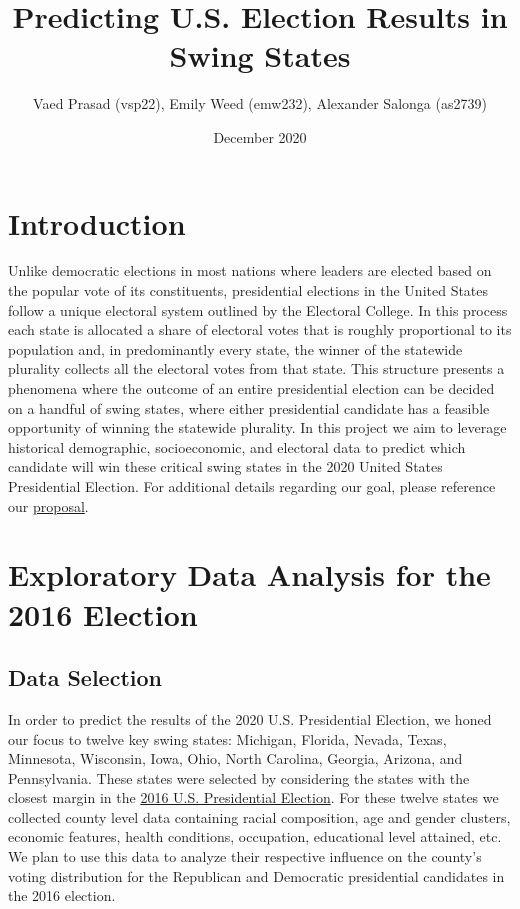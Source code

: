\documentclass[letterpaper, twocolumn]{article}
\title{Predicting U.S. Election Results in Swing States}
\author{Vaed Prasad (vsp22), Emily Weed (emw232), Alexander Salonga (as2739)}
\date{December 2020}
\begin{document}
\maketitle



\section{Introduction}

Unlike democratic elections in most nations where leaders are elected based on the popular vote of its constituents, presidential elections in the United States follow a unique electoral system outlined by the Electoral College. In this process each state is allocated a share of electoral votes that is roughly proportional to its population and, in predominantly every state, the winner of the statewide plurality collects all the electoral votes from that state. This structure presents a phenomena where the outcome of an entire presidential election can be decided on a handful of swing states, where either presidential candidate has a feasible opportunity of winning the statewide plurality. In this project we aim to leverage historical demographic, socioeconomic, and electoral data to predict which candidate will win these critical swing states in the 2020 United States Presidential Election. For additional details regarding our goal, please reference our \href{https://github.com/salongaale/ORIE-4741-Project/blob/main/project_proposal.md}{proposal}.%

\section{Exploratory Data Analysis for the 2016 Election}
\subsection{Data Selection}

In order to predict the results of the 2020 U.S. Presidential Election, we honed our focus to twelve key swing states: Michigan, Florida, Nevada, Texas, Minnesota, Wisconsin, Iowa, Ohio, North Carolina, Georgia, Arizona, and Pennsylvania. These states were selected by considering the states with the closest margin in the \href{https://www.nytimes.com/elections/2016/results/president}{2016 U.S. Presidential Election}. For these twelve states we collected county level data containing racial composition, age and gender clusters, economic features, health conditions, occupation, educational level attained, etc. We plan to use this data to analyze their respective influence on the county’s voting distribution for the Republican and Democratic presidential candidates in the 2016 election.
\end{document}
